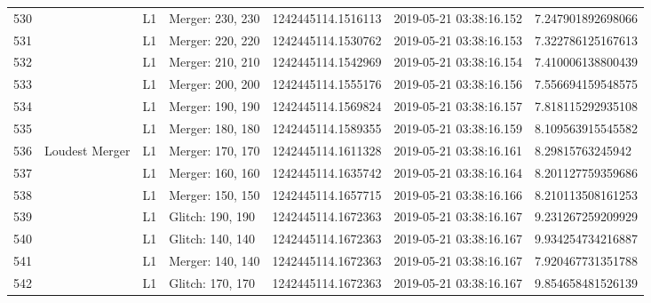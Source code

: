 \begin{longtable}{lllllll}
530  &                                                    &       L1 &  Merger: 230, 230 &  1242445114.1516113 &  2019-05-21 03:38:16.152 &   7.247901892698066 \\
531  &                                                    &       L1 &  Merger: 220, 220 &  1242445114.1530762 &  2019-05-21 03:38:16.153 &   7.322786125167613 \\
532  &                                                    &       L1 &  Merger: 210, 210 &  1242445114.1542969 &  2019-05-21 03:38:16.154 &   7.410006138800439 \\
533  &                                                    &       L1 &  Merger: 200, 200 &  1242445114.1555176 &  2019-05-21 03:38:16.156 &   7.556694159548575 \\
534  &                                                    &       L1 &  Merger: 190, 190 &  1242445114.1569824 &  2019-05-21 03:38:16.157 &   7.818115292935108 \\
535  &                                                    &       L1 &  Merger: 180, 180 &  1242445114.1589355 &  2019-05-21 03:38:16.159 &   8.109563915545582 \\
536  &                                     Loudest Merger &       L1 &  Merger: 170, 170 &  1242445114.1611328 &  2019-05-21 03:38:16.161 &    8.29815763245942 \\
537  &                                                    &       L1 &  Merger: 160, 160 &  1242445114.1635742 &  2019-05-21 03:38:16.164 &   8.201127759359686 \\
538  &                                                    &       L1 &  Merger: 150, 150 &  1242445114.1657715 &  2019-05-21 03:38:16.166 &   8.210113508161253 \\
539  &                                                    &       L1 &  Glitch: 190, 190 &  1242445114.1672363 &  2019-05-21 03:38:16.167 &   9.231267259209929 \\
540  &                                                    &       L1 &  Glitch: 140, 140 &  1242445114.1672363 &  2019-05-21 03:38:16.167 &   9.934254734216887 \\
541  &                                                    &       L1 &  Merger: 140, 140 &  1242445114.1672363 &  2019-05-21 03:38:16.167 &   7.920467731351788 \\
542  &                                                    &       L1 &  Glitch: 170, 170 &  1242445114.1672363 &  2019-05-21 03:38:16.167 &   9.854658481526139 \\

\end{longtable}
